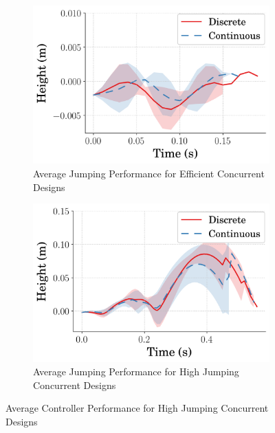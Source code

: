 %  
\begin{figure}[tb!]
  \centering
  \begin{subfigure}{.49\textwidth}
    \centering
    \includegraphics[width=\textwidth]{figures/Ch5/dis_vs_cont/avg_eff_RodPos_.png}  
    \caption{Average Jumping Performance for Efficient Concurrent Designs}
    \label{fig:disc_vs_cont_rodpos_eff}
  \end{subfigure}
  \hfill
  \begin{subfigure}{.49\textwidth}
    \centering
    \includegraphics[width=\textwidth]{figures/Ch5/dis_vs_cont/avg_hei_RodPos_.png}  
    \caption{Average Jumping Performance for High Jumping Concurrent Designs}
    \label{fig:disc_vs_cont_rodpos_hei}
  \end{subfigure}
   \caption{Average Controller Performance for High Jumping Concurrent Designs}
   \label{fig:disc_vs_cont_rodpos}
\end{figure}
% 

